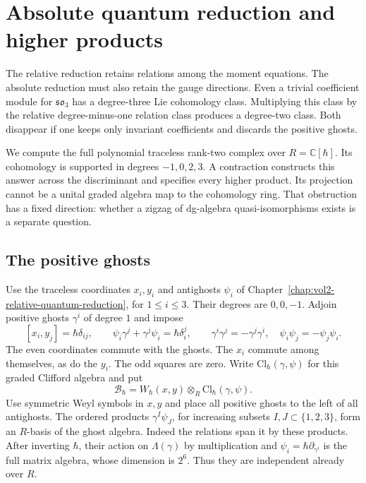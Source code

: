 \chapter{Absolute quantum reduction and higher products}
\label{chap:vol2-absolute-quantum-reduction}

The relative reduction retains relations among the moment
equations. The absolute reduction must also retain the gauge
directions. Even a trivial coefficient module for
$\mathfrak{so}_3$ has a degree-three Lie cohomology class.
Multiplying this class by the relative degree-minus-one relation
class produces a degree-two class. Both disappear if one keeps
only invariant coefficients and discards the positive ghosts.

We compute the full polynomial traceless rank-two complex over
$R=\mathbb C[\hbar]$. Its cohomology is supported in degrees
$-1,0,2,3$. A contraction constructs this answer across the
discriminant and specifies every higher product.
Its projection cannot be a unital graded algebra map to the
cohomology ring. That obstruction has a fixed direction:
whether a zigzag of dg-algebra quasi-isomorphisms exists is a
separate question.

\section{The positive ghosts}
\label{sec:vol2-absolute-ghosts}

Use the traceless coordinates $x_i,y_i$ and antighosts $\psi_i$
of Chapter~\ref{chap:vol2-relative-quantum-reduction}, for
$1\leq i\leq3$. Their degrees are $0,0,-1$.
Adjoin positive ghosts $\gamma^i$ of degree $1$ and impose
\begin{equation}\label{eq:vol2-absolute-ghost-relations}
 [x_i,y_j]=\hbar\delta_{ij},\qquad
 \psi_i\gamma^j+\gamma^j\psi_i=\hbar\delta_i^j,
 \qquad
 \gamma^i\gamma^j=-\gamma^j\gamma^i,\quad
 \psi_i\psi_j=-\psi_j\psi_i.
\end{equation}
The even coordinates commute with the ghosts.
The $x_i$ commute among themselves, as do the $y_i$.
The odd squares are zero. Write
$\mathrm{Cl}_\hbar(\gamma,\psi)$ for this graded Clifford
algebra and put
\[
 \mathcal B_\hbar
 =W_\hbar(x,y)\otimes_R\mathrm{Cl}_\hbar(\gamma,\psi).
\]
Use symmetric Weyl symbols in $x,y$ and place all positive
ghosts to the left of all antighosts. The ordered products
$\gamma^I\psi_J$, for increasing subsets $I,J\subset\{1,2,3\}$,
form an $R$-basis of the ghost algebra.
Indeed the relations span it by these products. After inverting
$\hbar$, their action on $\Lambda(\gamma)$ by multiplication
and $\psi_i=\hbar\partial_{\gamma^i}$ is the full matrix
algebra, whose dimension is $2^6$. Thus they are independent
already over $R$.

